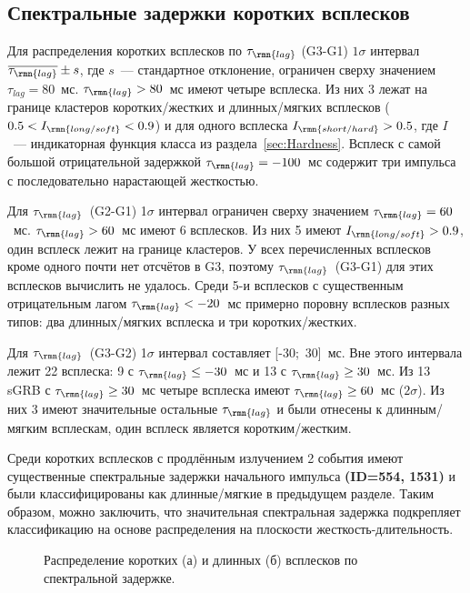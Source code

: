 \subsection{Спектральные задержки коротких всплесков}
Для распределения коротких всплесков по $\tau_{\rmn{lag}}$ (G3-G1) $1\sigma$ 
интервал $\overline{\tau_{\rmn{lag}}}\pm s$, где $s$~--- стандартное отклонение, 
ограничен сверху значением $\tau_{lag}=80$~мс. $\tau_{\rmn{lag}} > 80$~мс  имеют четыре всплеска. 
Из них 3 лежат на границе кластеров коротких/жестких и длинных/мягких всплесков 
($0.5<I_{\rmn{long/soft}}<0.9$) и для одного всплеска $I_{\rmn{short/hard}}>0.5$, 
где $I$~--- индикаторная функция класса из раздела~\ref{sec:Hardness}. 
Всплеск с самой большой отрицательной задержкой $\tau_{\rmn{lag}}=-100$~мс содержит три 
импульса с последовательно нарастающей жесткостью. 

Для $\tau_{\rmn{lag}}$~(G2-G1) 1$\sigma$ интервал ограничен сверху значением $\tau_{\rmn{lag}}=60$~мс. 
$\tau_{\rmn{lag}} > 60$~мс  имеют 6 всплесков. Из них 5 имеют $I_{\rmn{long/soft}}>0.9$, 
один всплеск лежит на границе кластеров. У всех перечисленных всплесков кроме 
одного почти нет отсчётов в G3, поэтому $\tau_{\rmn{lag}}$~(G3-G1) для этих всплесков 
вычислить не удалось. Среди 5-и всплесков с существенным отрицательным лагом 
$\tau_{\rmn{lag}} <-20$~мс примерно поровну всплесков разных типов: 
два длинных/мягких всплеска и три коротких/жестких.

Для $\tau_{\rmn{lag}}$~(G3-G2) 1$\sigma$ интервал составляет [-30;~30]~мс. 
Вне этого интервала лежит 22 всплеска: 9 с $\tau_{\rmn{lag}} \leq -30$~мс и 13 с $\tau_{\rmn{lag}} \geq 30$~мс. 
Из 13 sGRB с $\tau_{\rmn{lag}} \geq 30$~мс четыре всплеска имеют  $\tau_{\rmn{lag}} \geq 60$~мс ($2\sigma$). 
Из них 3 имеют значительные остальные $\tau_{\rmn{lag}}$ и были отнесены к длинным/мягким всплескам, 
один всплеск является коротким/жестким.

Среди коротких всплесков с продлённым излучением 2 события имеют существенные 
спектральные задержки начального импульса \textbf{(ID=554, 1531)} и были 
классифицированы как длинные/мягкие в предыдущем разделе. Таким образом, 
можно заключить, что значительная спектральная задержка подкрепляет классификацию 
на основе распределения на плоскости жесткость-длительность.



\begin{figure}[h]
  \begin{minipage}[h]{0.5\textwidth}
  \end{minipage}
  \hfill
  \begin{minipage}[h]{0.5\textwidth}
  \end{minipage}
  \caption{Распределение коротких (а) и длинных (б) всплесков по спектральной задержке.}
  \label{img:LagDistrs}  
\end{figure}

